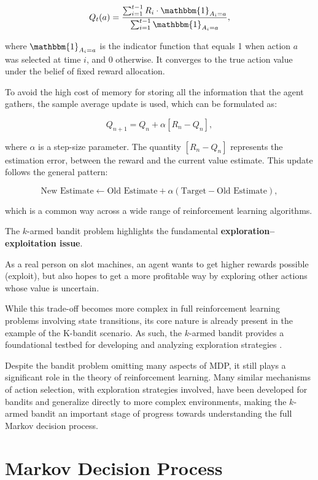 \[
Q_t(a) = \frac{\sum_{i=1}^{t-1} R_i \cdot \mathbbm{1}_{A_i=a}}{\sum_{i=1}^{t-1} \mathbbm{1}_{A_i=a}},
\]

where $\mathbbm{1}_{A_i=a}$ is the indicator function that equals 1 when action $a$ was selected at time $i$, and 0 otherwise. It converges to the true action value under the belief of fixed reward allocation.

To avoid the high cost of memory for storing all the information that the agent gathers, the sample average update is used, which can be formulated as:

\[
Q_{n+1} = Q_n + \alpha \left[ R_n - Q_n \right],
\]

where $\alpha$ is a step-size parameter. The quantity $[R_n - Q_n]$ represents the estimation error,  between the reward and the current value estimate. This update follows the general pattern:

\[
\text{New Estimate} \leftarrow \text{Old Estimate} + \alpha (\text{Target} - \text{Old Estimate}),
\]

which is a common way across a wide range of reinforcement learning algorithms.

The $k$-armed bandit problem highlights the fundamental \textbf{exploration--exploitation issue}. 

As a real person on slot machines, an agent wants to get higher rewards possible (exploit), but also hopes to get a more profitable way by exploring other actions whose value is uncertain.

While this trade-off becomes more complex in full reinforcement learning problems involving state transitions, its core nature is already present in the example of the K-bandit scenario. As such, the $k$-armed bandit provides a foundational testbed for developing and analyzing exploration strategies \cite{burnetas1997}.


Despite the bandit problem omitting many aspects of MDP, it still plays a significant role in the theory of reinforcement learning. Many similar mechanisms of action selection, with exploration strategies involved, have been developed for bandits and generalize directly to more complex environments, making the $k$-armed bandit an important stage of progress towards understanding the full Markov decision process.


\section{Markov Decision Process}


